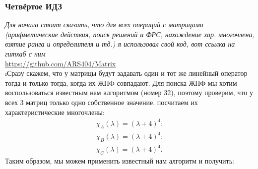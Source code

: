 \subsubsection{Четвёртое ИДЗ}

\textit{Для начала стоит сказать, что для всех операций с матрицами (арифметические действия, поиск решений и ФРС, нахождение хар. многочлена, взятие ранга и определителя и тд.) я использовал свой код, вот ссылка на гитхаб с ним}\\
\url{https://github.com/ARS404/Matrix}
\\

\i Сразу скажем, что у матрицы будут задавать один и тот же линейный оператор тогда и только тогда, когда их ЖНФ совпадают. Для поиска ЖНФ мы хотим воспользоваться известным нам алгоритмом (номер 32), поэтому проверим, что у всех 3 матриц только одно собственное значение. посчитаем их характеристические многочлены:
\begin{gather*}
    \chi_A(\lambda) = (\lambda + 4)^4;\\
    \chi_B(\lambda) = (\lambda + 4)^4;\\
    \chi_C(\lambda) = (\lambda + 4)^4.
\end{gather*}
Таким образом, мы можем применить известный нам алгоритм и получить:
